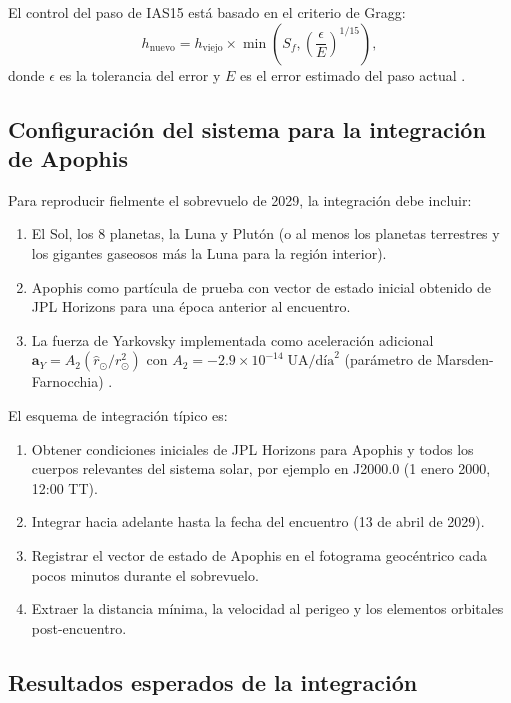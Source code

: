 \documentclass[a4paper]{article}
\begin{document}
El control del paso de IAS15 está basado en el criterio de Gragg:
\begin{equation}
  h_\text{nuevo} = h_\text{viejo} \times \min\!\left(S_f, \left(\frac{\epsilon}{E}\right)^{1/15}\right),
\end{equation}
donde $\epsilon$ es la tolerancia del error y $E$ es el error estimado del paso actual \cite{rein2012rebound}.

\subsection{Configuración del sistema para la integración de Apophis}

Para reproducir fielmente el sobrevuelo de 2029, la integración debe incluir:
\begin{enumerate}
  \item El Sol, los 8 planetas, la Luna y Plutón (o al menos los planetas terrestres y los gigantes gaseosos más la Luna para la región interior).
  \item Apophis como partícula de prueba con vector de estado inicial obtenido de JPL Horizons para una época anterior al encuentro.
  \item La fuerza de Yarkovsky implementada como aceleración adicional $\mathbf{a}_Y = A_2 (\hat{r}_\odot / r_\odot^2)$ con $A_2 = -2.9\times10^{-14}\;\text{UA/día}^2$ (parámetro de Marsden-Farnocchia) \cite{farnocchia2013yarkovsky}.
\end{enumerate}

El esquema de integración típico es:
\begin{enumerate}
  \item Obtener condiciones iniciales de JPL Horizons para Apophis y todos los cuerpos relevantes del sistema solar, por ejemplo en J2000.0 (1 enero 2000, 12:00 TT).
  \item Integrar hacia adelante hasta la fecha del encuentro (13 de abril de 2029).
  \item Registrar el vector de estado de Apophis en el fotograma geocéntrico cada pocos minutos durante el sobrevuelo.
  \item Extraer la distancia mínima, la velocidad al perigeo y los elementos orbitales post-encuentro.
\end{enumerate}

\subsection{Resultados esperados de la integración}
\end{document}
